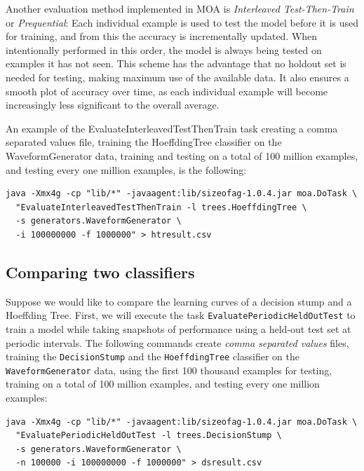 \documentclass[a4paper,12pt,twoside]{book}
\begin{document}
Another evaluation method implemented in MOA is \emph{Interleaved Test-Then-Train}  or \emph{Prequential}:
 Each individual example is used to test the model
before it is used for training, and from this the accuracy is incrementally
updated. When intentionally performed in this order, the model is always
being tested on examples it has not seen. This scheme has the advantage that
no holdout set is needed for testing, making maximum use of the available
data. It also ensures a smooth plot of accuracy over time, as each individual
example will become increasingly less significant to the overall average.

An example of the EvaluateInterleavedTestThenTrain task  
creating a comma separated values file, training the
HoeffdingTree classifier on the WaveformGenerator data, training and testing on a total of 100 million
examples, and testing every one million examples, is the following:

\begin{footnotesize}\begin{verbatim}
java -Xmx4g -cp "lib/*" -javaagent:lib/sizeofag-1.0.4.jar moa.DoTask \
  "EvaluateInterleavedTestThenTrain -l trees.HoeffdingTree \
  -s generators.WaveformGenerator \
  -i 100000000 -f 1000000" > htresult.csv
\end{verbatim}
\end{footnotesize}

\subsection{Comparing two classifiers}

Suppose we would like to compare the learning curves of a decision stump and a Hoeffding Tree.
First, we will execute the
 task \verb+EvaluatePeriodicHeldOutTest+ to train a model while taking snapshots of performance using a held-out test set at periodic intervals.
The following commands create {\em comma separated values} files, training the \verb+DecisionStump+ and the \verb+HoeffdingTree+ classifier on the \verb+WaveformGenerator+ data, using the first 100 thousand examples for testing, training on a total of 100 million examples, and testing every one million examples:

\begin{footnotesize}\begin{verbatim}
java -Xmx4g -cp "lib/*" -javaagent:lib/sizeofag-1.0.4.jar moa.DoTask \
  "EvaluatePeriodicHeldOutTest -l trees.DecisionStump \
  -s generators.WaveformGenerator \
  -n 100000 -i 100000000 -f 1000000" > dsresult.csv
\end{verbatim}\end{footnotesize}
\end{document}
